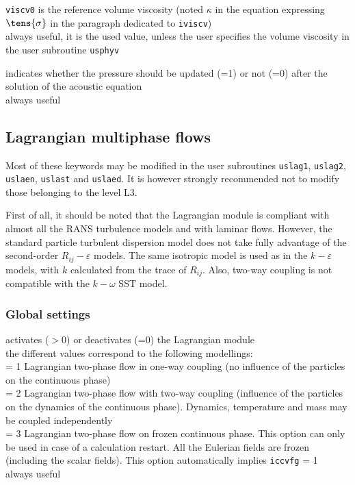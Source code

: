 {\texttt{viscv0} is the reference volume
viscosity (noted $\kappa$ in the equation expressing $\tens{\sigma}$ in the
paragraph dedicated to \texttt{iviscv})\\
always useful, it is the used value, unless the user specifies the volume
viscosity in the user subroutine \texttt{usphyv}}

{indicates whether the pressure should be updated (=1) or not (=0) after the
solution of the acoustic equation\\
always useful}

\subsection{Lagrangian multiphase flows}
\label{sec:prg_motscles_lagr}

Most of these keywords may be modified in the user subroutines
\texttt{uslag1}, \texttt{uslag2}, \texttt{uslaen},
\texttt{uslast} and \texttt{uslaed}. It is however strongly recommended
not to modify those belonging to the level L3.

First of all, it should be noted that the Lagrangian module is compliant with
almost all the RANS turbulence models and with laminar flows. However, the standard particle
turbulent dispersion model does not take fully advantage of the second-order
$R_{ij}-\varepsilon$ models. The same isotropic model is used as in the
$k-\varepsilon$ models, with $k$ calculated from the trace of $R_{ij}$. Also,
two-way coupling is not compatible with the $k-\omega$ SST model.


\subsubsection{Global settings}

{activates ($>$0) or deactivates (=0) the Lagrangian module\\
the different values correspond to the following modellings: \\
\hspace*{1.3cm} = 1 Lagrangian two-phase flow in one-way coupling (no influence of
the particles on the continuous phase)\\
\hspace*{1.3cm} = 2 Lagrangian two-phase flow with two-way coupling (influence of
the particles on the dynamics of the continuous phase). Dynamics, temperature and mass may be coupled independently\\
\hspace*{1.3cm} = 3 Lagrangian two-phase flow on frozen continuous phase. This option can
only be used in case of a calculation restart. All the
Eulerian fields are frozen (including the scalar fields). This option
automatically implies \texttt{iccvfg} = 1\\
always useful}

